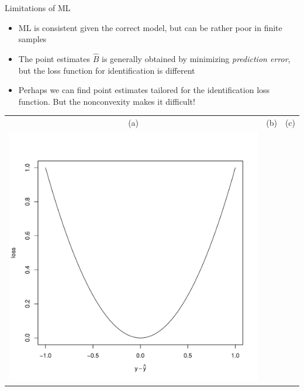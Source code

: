 \documentclass[final]{beamer}
\newlength{\onecolwid}
\begin{document}
\begin{frame}[t]
\begin{columns}[t]
\begin{column}{\onecolwid}
\begin{block}{Limitations of ML}
\begin{itemize}
\item ML is consistent given the correct model, but can be rather poor in finite samples
\item The point estimates $\hat{B}$ is generally obtained by minimizing \emph{prediction error}, but the loss function for identification is different
\item Perhaps we can find point estimates tailored for the identification loss function.  But the nonconvexity makes it difficult!
\end{itemize}
\begin{center}
\begin{tabular}{ccc}
(a) & (b) & (c)\\
\includegraphics[scale = 0.5, trim = 1in 1in 0.5in 1in, clip]{loss_se.pdf} & 

\end{tabular}
\end{center}
\end{block}
\end{column}
\end{columns}
\end{frame}
\end{document}
